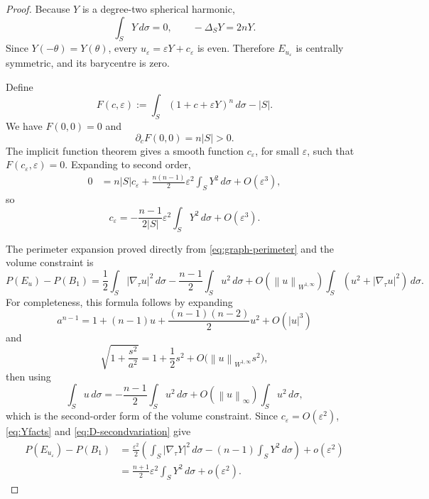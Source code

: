 \documentclass[11pt]{amsart}
\theoremstyle{definition}
\newcommand{\eps}{\varepsilon}
\newcommand{\Per}{P}
\newcommand{\norm}[1]{\left\|#1\right\|}
\begin{document}
\begin{proof}
Because \(Y\) is a degree-two spherical harmonic,
\[
   \int_SY\,d\sigma=0,\qquad
   -\Delta_SY=2nY.
\tag{3.52}\label{eq:Yfacts}
\]
Since \(Y(-\theta)=Y(\theta)\), every \(u_\eps=\eps Y+c_\eps\) is even.
Therefore \(E_{u_\eps}\) is centrally symmetric, and its barycentre is zero.

Define
\[
   F(c,\eps):=\int_S(1+c+\eps Y)^n\,d\sigma-|S|.
\]
We have \(F(0,0)=0\) and
\[
   \partial_cF(0,0)=n|S|>0.
\]
The implicit function theorem gives a smooth function \(c_\eps\), for small
\(\eps\), such that \(F(c_\eps,\eps)=0\).  Expanding to second order,
\[
\begin{aligned}
   0
   &=n|S|c_\eps+
     \frac{n(n-1)}2\eps^2\int_SY^2\,d\sigma
     +O(\eps^3),
\end{aligned}
\]
so
\[
   c_\eps
   =-\frac{n-1}{2|S|}\eps^2\int_SY^2\,d\sigma+O(\eps^3).
\tag{3.53}\label{eq:ceps}
\]

The perimeter expansion proved directly from
\eqref{eq:graph-perimeter} and the volume constraint is
\[
   \Per(E_u)-\Per(B_1)
   =
   \frac12\int_S|\nabla_\tau u|^2\,d\sigma
   -\frac{n-1}{2}\int_Su^2\,d\sigma
   +O(\norm{u}_{W^{1,\infty}})\!
      \int_S(u^2+|\nabla_\tau u|^2)\,d\sigma.
\tag{3.54}\label{eq:D-secondvariation}
\]
For completeness, this formula follows by expanding
\[
   a^{n-1}=1+(n-1)u+\frac{(n-1)(n-2)}2u^2+O(|u|^3)
\]
and
\[
   \sqrt{1+\frac{s^2}{a^2}}
   =1+\frac12s^2+O\bigl(\norm{u}_{W^{1,\infty}}s^2\bigr),
\]
then using
\[
   \int_Su\,d\sigma
   =-\frac{n-1}{2}\int_Su^2\,d\sigma+O(\norm{u}_\infty)\int_Su^2\,d\sigma,
\]
which is the second-order form of the volume constraint.
Since \(c_\eps=O(\eps^2)\), \eqref{eq:Yfacts} and
\eqref{eq:D-secondvariation} give
\[
\begin{aligned}
   \Per(E_{u_\eps})-\Per(B_1)
   &=\frac{\eps^2}{2}
      \left(\int_S|\nabla_\tau Y|^2\,d\sigma
       -(n-1)\int_SY^2\,d\sigma\right)+o(\eps^2) \\
   &=\frac{n+1}{2}\eps^2\int_SY^2\,d\sigma+o(\eps^2).
\end{aligned}
\tag{3.55}\label{eq:D-Y}
\]


\end{proof}
\end{document}
